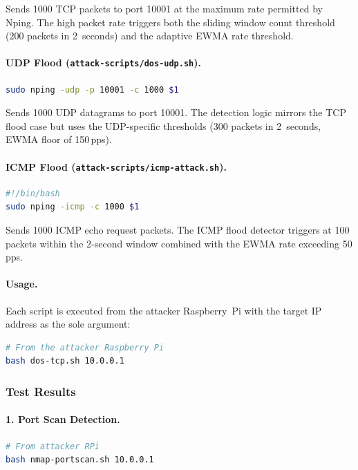 \documentclass[12pt,a4paper]{article}
\begin{document}
Sends 1000 TCP packets to port 10001 at the maximum rate permitted by Nping. The high packet rate triggers both the sliding window count threshold (200 packets in 2~seconds) and the adaptive EWMA rate threshold.

\paragraph{UDP Flood (\texttt{attack-scripts/dos-udp.sh}).}
\begin{lstlisting}[language=bash]
sudo nping -udp -p 10001 -c 1000 $1
\end{lstlisting}

Sends 1000 UDP datagrams to port 10001. The detection logic mirrors the TCP flood case but uses the UDP-specific thresholds (300 packets in 2~seconds, EWMA floor of 150\,pps).

\paragraph{ICMP Flood (\texttt{attack-scripts/icmp-attack.sh}).}
\begin{lstlisting}[language=bash]
#!/bin/bash
sudo nping -icmp -c 1000 $1
\end{lstlisting}

Sends 1000 ICMP echo request packets. The ICMP flood detector triggers at 100 packets within the 2-second window combined with the EWMA rate exceeding 50\,pps.

\paragraph{Usage.} Each script is executed from the attacker Raspberry~Pi with the target IP address as the sole argument:

\begin{lstlisting}[language=bash]
# From the attacker Raspberry Pi
bash dos-tcp.sh 10.0.0.1
\end{lstlisting}

\subsubsection{Test Results}

\paragraph{1. Port Scan Detection.}

\begin{lstlisting}[language=bash]
# From attacker RPi
bash nmap-portscan.sh 10.0.0.1
\end{lstlisting}
\end{document}
